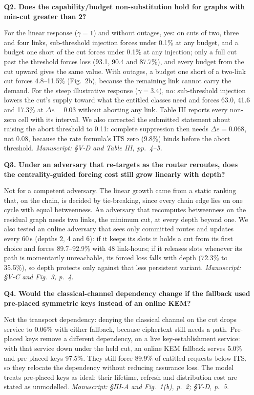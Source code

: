 \documentclass[10pt,a4paper]{article}
\newcommand{\loc}[1]{\textit{Manuscript: #1.}}
\newcommand{\comment}[2]{\par\medskip\noindent\textbf{#1}\hspace{0.4em}\textit{#2}\par}
\begin{document}
\comment{Q2. Does the capability/budget non-substitution hold for graphs with min-cut greater than 2?}{}
For the linear response ($\gamma=1$) and without outages, yes: on cuts of two, three
and four links, sub-threshold injection forces under 0.1\% at any budget, and a budget
one short of the cut forces under 0.1\% at any injection; only a full cut past the
threshold forces loss (93.1, 90.4 and 87.7\%), and every budget from the cut upward
gives the same value. With outages, a budget one short of a two-link cut forces
4.8--11.5\% (Fig.~2b), because the remaining link cannot carry the demand. For the
steep illustrative response ($\gamma=3.4$), no: sub-threshold injection lowers the
cut's supply toward what the entitled classes need and forces 63.0, 41.6 and 17.3\% at
$\Delta e=0.03$ without aborting any link. Table III reports every non-zero cell with
its interval. We also corrected the submitted statement about raising the abort
threshold to 0.11: complete suppression then needs $\Delta e=0.068$, not 0.08,
because the rate formula's ITS zero (9.8\%) binds before the abort threshold.
\loc{\S V-D and Table III, pp.~4--5}

\comment{Q3. Under an adversary that re-targets as the router reroutes, does the centrality-guided forcing cost still grow linearly with depth?}{}
Not for a competent adversary. The linear growth came from a static ranking that, on
the chain, is decided by tie-breaking, since every chain edge lies on one cycle with
equal betweenness. An adversary that recomputes betweenness on the residual graph needs
two links, the minimum cut, at every depth beyond one. We also tested an online
adversary that sees only committed routes and updates every 60\,s (depths 2, 4 and 6):
if it keeps its slots it holds a cut from its first choice and forces 89.7--92.9\%
with 48 link-hours; if it releases slots whenever its path is momentarily
unreachable, its forced loss falls with depth (72.3\% to 35.5\%), so depth protects
only against that less persistent variant.
\loc{\S V-C and Fig.~3, p.~4}

\comment{Q4. Would the classical-channel dependency change if the fallback used pre-placed symmetric keys instead of an online KEM?}{}
Not the transport dependency: denying the classical channel on the cut drops service
to 0.06\% with either fallback, because ciphertext still needs a path. Pre-placed keys
remove a different dependency, on a live key-establishment service: with that service
down under the held cut, an online KEM fallback serves 5.0\% and pre-placed keys
97.5\%. They still force 89.9\% of entitled requests below ITS, so they relocate the
dependency without reducing assurance loss. The model treats pre-placed keys as ideal;
their lifetime, refresh and distribution cost are stated as unmodelled.
\loc{\S III-A and Fig.~1(b), p.~2; \S V-D, p.~5}
\end{document}

